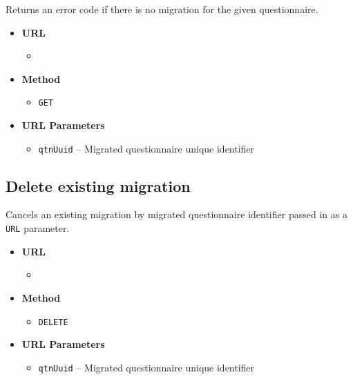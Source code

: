 Returns an error code if there is no migration for the given questionnaire.

\begin{itemize}
    \item \textbf{URL}
        \begin{itemize}
            \item {}
        \end{itemize}

    \item \textbf{Method}
        \begin{itemize}
            \item \texttt{GET}
        \end{itemize}

    \item \textbf{URL Parameters}
        \begin{itemize}
            \item \texttt{qtnUuid} -- Migrated questionnaire unique identifier
        \end{itemize}
\end{itemize}

\subsection{Delete existing migration}

Cancels an existing migration by migrated questionnaire identifier passed in as a \texttt{URL} parameter.

\begin{itemize}
    \item \textbf{URL}
        \begin{itemize}
            \item {}
        \end{itemize}

    \item \textbf{Method}
        \begin{itemize}
            \item \texttt{DELETE}
        \end{itemize}

    \item \textbf{URL Parameters}
        \begin{itemize}
            \item \texttt{qtnUuid} -- Migrated questionnaire unique identifier
        \end{itemize}
\end{itemize}

